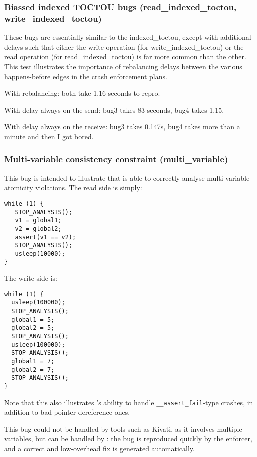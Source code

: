 
\subsubsection{Biassed indexed TOCTOU bugs (read\_indexed\_toctou, write\_indexed\_toctou)}

These bugs are essentially similar to the indexed\_toctou, except with
additional delays such that either the write operation (for
write\_indexed\_toctou) or the read operation (for
read\_indexed\_toctou) is far more common than the other.  This test
illustrates the importance of rebalancing delays between the various
happens-before edges in the crash enforcement plans.

With rebalancing: both take 1.16 seconds to repro.

With delay always on the send: bug3 takes 83 seconds, bug4 takes 1.15.

With delay always on the receive: bug3 takes 0.147s, bug4 takes more
than a minute and then I got bored.


\subsubsection{Multi-variable consistency constraint (multi\_variable)}

This bug is intended to illustrate that {\technique} is able to
correctly analyse multi-variable atomicity violations.  The read side
is simply:

\begin{verbatim}
while (1) {
   STOP_ANALYSIS();
   v1 = global1;
   v2 = global2;
   assert(v1 == v2);
   STOP_ANALYSIS();
   usleep(10000);
}
\end{verbatim}

The write side is:

\begin{verbatim}
while (1) {
  usleep(100000);
  STOP_ANALYSIS();
  global1 = 5;
  global2 = 5;
  STOP_ANALYSIS();
  usleep(100000);
  STOP_ANALYSIS();
  global1 = 7;
  global2 = 7;
  STOP_ANALYSIS();
}
\end{verbatim}

Note that this also illustrates {\technique}'s ability to handle
\verb|__assert_fail|-type crashes, in addition to bad pointer
dereference ones.

This bug could not be handled by tools such as Kivati\needCite{}, as
it involves multiple variables, but can be handled by {\technique}:
the bug is reproduced quickly by the enforcer, and a correct and
low-overhead fix is generated automatically.

